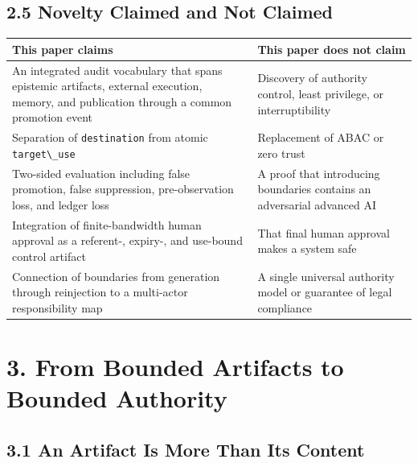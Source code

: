 \subsection{2.5 Novelty Claimed and Not Claimed}\label{novelty-claimed-and-not-claimed}

{\def\LTcaptype{none} %
\begin{longtable}[]{@{}
  >{\raggedright\arraybackslash}p{}
  >{\raggedright\arraybackslash}p{}@{}}
\toprule\noalign{}
\begin{minipage}[b]{\linewidth}\raggedright
This paper claims
\end{minipage} & \begin{minipage}[b]{\linewidth}\raggedright
This paper does not claim
\end{minipage} \\
\midrule\noalign{}
\endhead
\bottomrule\noalign{}
\endlastfoot
An integrated audit vocabulary that spans epistemic artifacts, external execution, memory, and publication through a common promotion event & Discovery of authority control, least privilege, or interruptibility \\
Separation of \passthrough{\lstinline!destination!} from atomic \passthrough{\lstinline!target\_use!} & Replacement of ABAC or zero trust \\
Two-sided evaluation including false promotion, false suppression, pre-observation loss, and ledger loss & A proof that introducing boundaries contains an adversarial advanced AI \\
Integration of finite-bandwidth human approval as a referent-, expiry-, and use-bound control artifact & That final human approval makes a system safe \\
Connection of boundaries from generation through reinjection to a multi-actor responsibility map & A single universal authority model or guarantee of legal compliance \\
\end{longtable}
}

\section{3. From Bounded Artifacts to Bounded Authority}\label{from-bounded-artifacts-to-bounded-authority}

\subsection{3.1 An Artifact Is More Than Its Content}\label{an-artifact-is-more-than-its-content}

